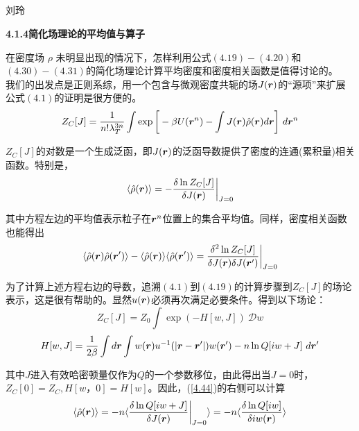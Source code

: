 \subsection{ }

\begin{center}
刘玲
\end{center}

\textbf{4.1.4简化场理论的平均值与算子}

在密度场 $\rho $ 未明显出现的情况下，怎样利用公式$(4.19)-(4.20)$和$(4.30)-(4.31)$的简化场理论计算平均密度和密度相关函数是值得讨论的。\\

我们的出发点是正则系综，用一个包含与微观密度共轭的场$J(\bm{r})$的“源项”来扩展公式$(4.1)$的证明是很方便的。\\
\begin{equation}
Z_{C}[J]=\frac{1}{n! \lambda _{T}^{3n}} \int  \exp \bigg[-\beta U(\bm{r}^{n})- \int J(\bm{r}) \hat{ \rho }(\bm{r})d\bm{r} \bigg]~ d \bm{r}^{n}
\end{equation}

$Z_{C}[J]$的对数是一个生成泛函，即$J(\bm{r})$的泛函导数提供了密度的连通(累积量)相关函数。特别是，\\
\begin{equation}
\langle \hat{ \rho } (\bm{r}) \rangle = - \frac{\delta \ln Z_{C}[J] }{\delta J(\bm{r})} \bigg |_{J=0}
\end{equation}

其中方程左边的平均值表示粒子在$\bm{r}^{n}$位置上的集合平均值。同样，密度相关函数也能得出\\
\begin{equation}
\langle \hat{ \rho } (\bm{r}) \hat{ \rho } (\bm{r}')\rangle - \langle  \hat{ \rho } (\bm{r}) \rangle \langle  \hat{ \rho } (\bm{r}') \rangle = \frac{\delta ^{2} \ln Z_{C}[J]}{\delta J(\bm{r}) \delta J(\bm{r}')} \bigg |_{J=0}
\label{4.44}
\end{equation}

为了计算上述方程右边的导数，追溯$(4.1)$到$(4.19)$的计算步骤到$Z_{C}[J]$的场论表示，这是很有帮助的。显然$u(\bm{r})$必须再次满足必要条件。得到以下场论：\\
\begin{equation}
Z_{C}[J]=Z_{0} \int \exp (-H[w,J]) ~\mathcal{D} w 
\end{equation}
\begin{equation}
H[w ,J]=\frac{1}{2 \beta } \int d\bm{r} \int w (\bm{r}) u^{-1} (|\bm{r}-\bm{r}'|) w (\bm{r}') - n \ln Q[i w +J] ~d\bm{r}'
\end{equation}

其中$J$进入有效哈密顿量仅作为$Q$的一个参数移位，由此得出当$J=0$时，$Z_{C}[0]=Z_{C},H[ w，0]=H[ w ]$。因此，(\ref{4.44})的右侧可以计算\\
\begin{equation}
\langle \hat{ \rho } (\bm{r}) \rangle = - n \langle \frac{ \delta \ln Q[i w + J ]}{ \delta J(\bm{r}) } \bigg|_{J=0} \rangle = -n \langle \frac{\delta \ln Q[ i w]}{ \delta i w (\bm{r})} \rangle
\label{4.48}
\end{equation}

